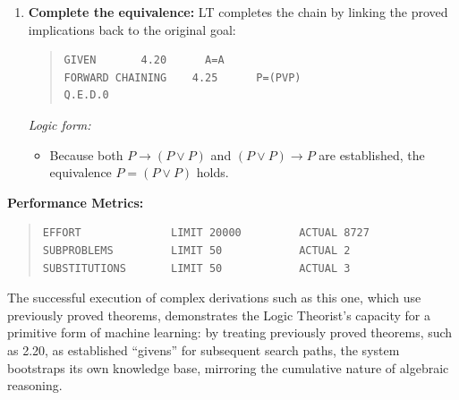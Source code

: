 \documentclass[journal]{IEEEtran}
\begin{document}
\begin{enumerate}
\item \textbf{Complete the equivalence:}
LT completes the chain by linking the proved implications back to the original goal:
\begin{quote}
\begin{verbatim}
GIVEN       4.20      A=A
FORWARD CHAINING    4.25      P=(PVP)
Q.E.D.0
\end{verbatim}
\end{quote}
\textit{Logic form:} 
\begin{itemize}
    \item[] Because both $P \rightarrow (P \lor P)$ and $(P \lor P) \rightarrow P$ are established, the equivalence $P = (P \lor P)$ holds.
\end{itemize}

\end{enumerate}

\textbf{Performance Metrics:}
\begin{quote}
\begin{verbatim}
EFFORT              LIMIT 20000         ACTUAL 8727
SUBPROBLEMS         LIMIT 50            ACTUAL 2
SUBSTITUTIONS       LIMIT 50            ACTUAL 3
\end{verbatim}
\end{quote}

\medskip

\noindent The successful execution of complex derivations such as this
one, which use previously proved theorems, demonstrates the Logic
Theorist's capacity for a primitive form of machine learning: by
treating previously proved theorems, such as 2.20, as established
``givens'' for subsequent search paths, the system bootstraps its own
knowledge base, mirroring the cumulative nature of algebraic
reasoning.
\end{document}
